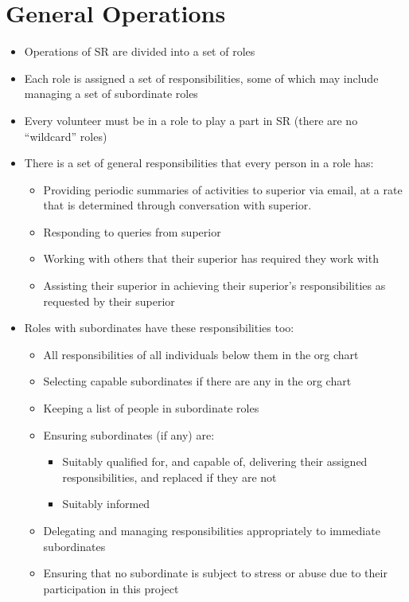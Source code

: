 \chapter{General Operations}


\begin{itemize}
\item Operations of SR are divided into a set of roles
\item Each role is assigned a set of responsibilities, some of which may include managing a set of subordinate roles
\item Every volunteer must be in a role to play a part in SR (there are no ``wildcard'' roles)

\item There is a set of general responsibilities that every person in a role has:
  \begin{itemize}
  \item Providing periodic summaries of activities to superior via email, at a rate that is determined through conversation with superior.
  \item Responding to queries from superior
  \item Working with others that their superior has required they work with
  \item Assisting their superior in achieving their superior's responsibilities as requested by their superior
  \end{itemize}
\item Roles with subordinates have these responsibilities too:
  \begin{itemize}
    \item All responsibilities of all individuals below them in the org chart
    \item Selecting capable subordinates if there are any in the org chart
    \item Keeping a list of people in subordinate roles
    \item Ensuring subordinates (if any) are:
      \begin{itemize}
      \item Suitably qualified for, and capable of, delivering their assigned responsibilities, and replaced if they are not
      \item Suitably informed
      \end{itemize}
    \item Delegating and managing responsibilities appropriately to immediate subordinates
    \item Ensuring that no subordinate is subject to stress or abuse due to their participation in this project
  \end{itemize}


\end{itemize}
